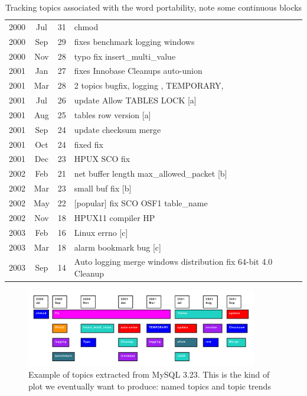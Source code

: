 \documentclass[times, 10pt,twocolumn]{article}
\begin{document}
\begin{table}
\centering
\begin{tabular}{|ccc|l|}
\hline
2000 &  Jul &  31 &    chmod \\
2000 &  Sep &  29 &    fixes benchmark logging windows \\
2000 &  Nov &  28 &    typo fix insert\_multi\_value \\
2001 &  Jan &  27 &    fixes Innobase Cleanups auto-union \\
2001 &  Mar &  28 &    2 topics bugfix, logging , TEMPORARY,  \\
\hline
2001 &  Jul &  26 &    update Allow TABLES LOCK [a] \\ 

2001 &  Aug &  25 &    tables row version [a] \\
\hline
2001 &  Sep &  24 &    update checksum merge \\
2001 &  Oct &  24 &    fixed fix \\
2001 &  Dec &  23 &    HPUX SCO fix \\
\hline
2002 &  Feb &  21 &    net buffer length  max\_allowed\_packet [b] \\
2002 &  Mar &  23 &    small buf fix [b]  \\
\hline
2002 &  May &  22 &    [popular] fix SCO OSF1 table\_name \\
2002 &  Nov &  18 &    HPUX11 compiler HP \\
\hline
2003 &  Feb &  16 &    Linux errno  [c] \\
2003 &  Mar &  18 &    alarm bookmark bug [c] \\
\hline
2003 &  Sep &  14 &    Auto logging merge windows distribution fix 64-bit 4.0 Cleanup \\
\hline
\end{tabular}
\caption{Tracking topics associated with the word portability, note some continuous blocks}
\label{tab:portability}
\end{table}

\begin{figure}
  \centering
  \includegraphics[width=0.9\textwidth]{lda}
  \caption{Example of topics extracted from MySQL 3.23. This is the kind of plot we eventually want to produce: named topics and topic trends}
  \label{fig:lda}
\end{figure}
\end{document}
